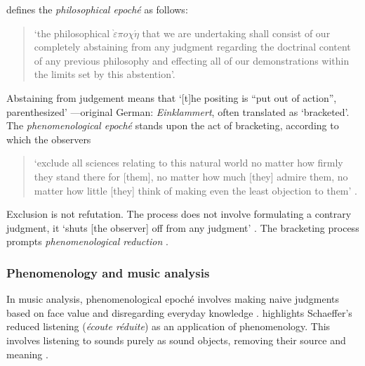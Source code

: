 \documentclass{article}
\begin{document}
\citet[p.~33]{husserl1983ideas} defines the \emph{philosophical epoch\'{e}} as follows: 
\begin{quotation}
\noindent`the philosophical $\grave{\varepsilon} \pi o \chi \acute{\eta}$ that we are undertaking shall consist of our completely abstaining from any judgment regarding the doctrinal content of any previous philosophy and effecting all of our demonstrations within the limits set by this abstention'.%
\end{quotation}
Abstaining from judgement means that `[t]he positing is ``put out of action'', parenthesized' \citep[pp.~59--60]{husserl1983ideas}---original German: \emph{Einklammert}, often translated as `bracketed'. The \emph{phenomenological epoch\'{e}} stands upon the act of bracketing, according to which the observers 
\begin{quotation}
\noindent`exclude all sciences relating to this natural world no matter how firmly they stand there for [them], no matter how much [they] admire them, no matter how little [they] think of making even the least objection to them' \citep[p.~61]{husserl1983ideas}.%
\end{quotation}
Exclusion is not refutation. The process does not involve formulating a contrary judgment, it `shuts [the observer] off from any judgment' \citep[p.~61]{husserl1983ideas}. The bracketing process prompts \emph{phenomenological reduction} \citep[p.~66]{husserl1983ideas}. 





\subsubsection{Phenomenology and music analysis}

In music analysis, phenomenological epoch\'{e} involves making naive judgments based on face value and disregarding everyday knowledge \citep[p.~3]{serhan2022phenomenological}. \citeauthor{serhan2022phenomenological} highlights Schaeffer's reduced listening (\emph{\'{e}coute r\'{e}duite}) as an application of phenomenology. This involves listening to sounds purely as sound objects, removing their source and meaning \citep[p.~33]{chion1983guide}.
\end{document}
